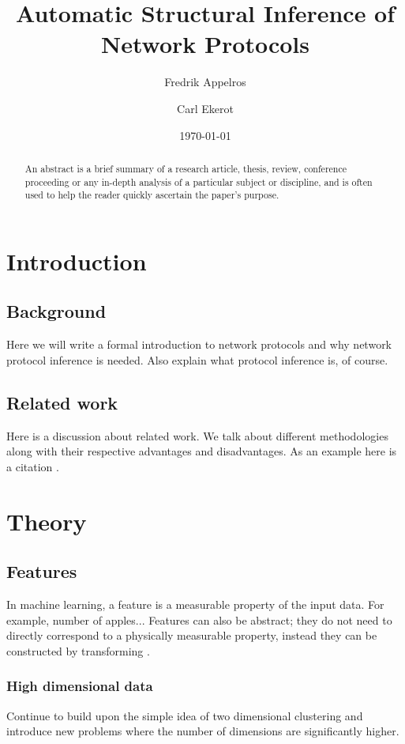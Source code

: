 \documentclass[a4paper]{report}
\begin{document}
\title{Automatic Structural Inference of Network Protocols}
\author{Fredrik Appelros \and Carl Ekerot}
\date{\today}
\maketitle

\begin{abstract}
An abstract is a brief summary of a research article, thesis, review,
conference proceeding or any in-depth analysis of a particular subject or
discipline, and is often used to help the reader quickly ascertain the paper's
purpose.
\end{abstract}

\tableofcontents

\chapter{Introduction}

\section{Background}
Here we will write a formal introduction to network protocols and why network
protocol inference is needed. Also explain what protocol inference is, of
course.

\section{Related work}
Here is a discussion about related work. We talk about different methodologies
along with their respective advantages and disadvantages. As an example here
is a citation \cite{cui07}.

\chapter{Theory}

\section{Features}
In machine learning, a feature is a measurable property of the input data. For
example, number of apples...
Features can also be abstract; they do not need to directly correspond to a
physically measurable property, instead they can be constructed by transforming
.

\subsection{High dimensional data}
Continue to build upon the simple idea of two dimensional clustering and
introduce new problems where the number of dimensions are significantly
higher.
\end{document}
